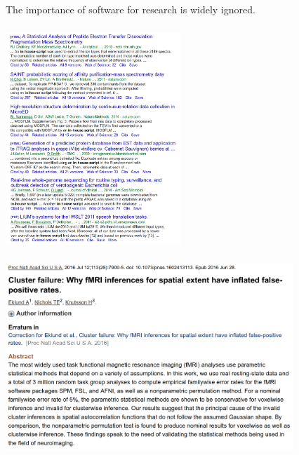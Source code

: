 \documentclass{beamer}
\begin{document}
\begin{frame}
  \frametitle{}
  \begin{block}{}
    \begin{center}
      The importance of software for research is widely ignored.
      \end{center}
  \end{block}
\end{frame}

\begin{frame}
  \frametitle{}
  \begin{center}
    \includegraphics[height=8cm]{images/In-house_script.jpg}
  \end{center}
\end{frame}

\begin{frame}
  \frametitle{}
  \begin{center}
    \includegraphics[height=7cm]{images/fMRI_software_failure.png}
  \end{center}
\end{frame}
\end{document}

